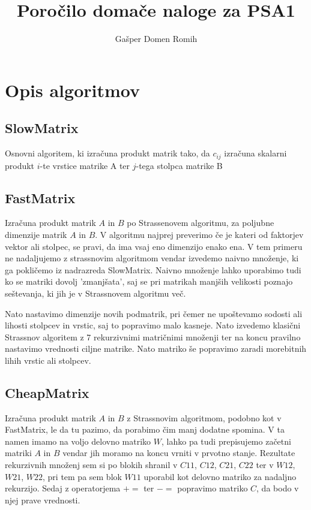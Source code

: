 \documentclass[a4paper]{article}
\begin{document}
\title{Poročilo domače naloge za PSA1}
\author{Gašper Domen Romih}
\maketitle
\newpage
\section{Opis algoritmov}
\subsection{SlowMatrix}
Osnovni algoritem, ki izračuna produkt matrik tako, da $c_{ij}$ izračuna skalarni produkt $i$-te vrstice matrike A ter $j$-tega stolpca matrike B
\subsection{FastMatrix}

Izračuna produkt matrik $A$ in $B$ po Strassenovem algoritmu, za poljubne dimenzije matrik $A$ in $B$. V algoritmu najprej preverimo če je kateri od 
faktorjev vektor ali stolpec, se pravi, da ima vsaj eno dimenzijo enako ena. V tem primeru ne nadaljujemo z strassnovim algoritmom vendar izvedemo naivno množenje, ki ga pokličemo iz nadrazreda SlowMatrix. Naivno množenje lahko uporabimo tudi ko se matriki dovolj  'zmanjšata', saj se pri matrikah manjših velikosti poznajo seštevanja, ki jih je v Strassnovem algoritmu več. 

Nato nastavimo dimenzije novih podmatrik, pri čemer ne upoštevamo sodosti ali lihosti stolpcev in vrstic, saj to popravimo malo kasneje. Nato izvedemo klasični Strassnov algoritem z 7 rekurzivnimi matričnimi množenji ter na koncu pravilno nastavimo vrednosti ciljne matrike. Nato matriko še popravimo zaradi morebitnih lihih vrstic ali stolpcev.

\subsection{CheapMatrix}

Izračuna produkt matrik $A$ in $B$ z Strassnovim algoritmom, podobno kot v FastMatrix, le da tu pazimo, da porabimo čim manj dodatne spomina. V ta namen imamo na voljo delovno matriko $W$, lahko pa tudi prepisujemo začetni matriki $A$ in $B$ vendar jih moramo na koncu vrniti v prvotno stanje. Rezultate rekurzivnih množenj sem si po blokih shranil v $C11$, $C12$, $C21$, $C22$ ter v $W12$, $W21$, $W22$, pri tem pa sem blok $W11$ uporabil kot delovno matriko za nadaljno rekurzijo. Sedaj z operatorjema $+=$ ter $-=$ popravimo matriko $C$, da bodo v njej prave vrednosti.
\end{document}
